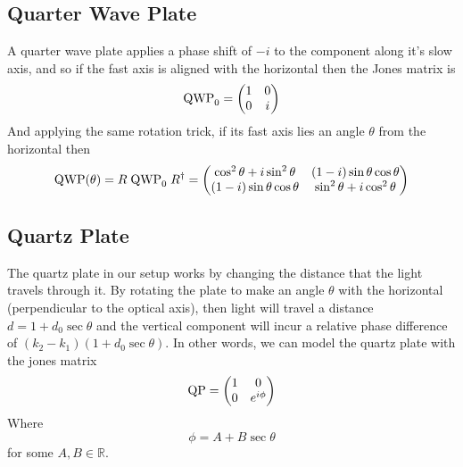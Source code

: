	\subsection{Quarter Wave Plate}
	A quarter wave plate applies a phase shift of $-i$ to the component along it's slow axis, and so if the fast axis is aligned with the horizontal then the Jones matrix is
	\begin{equation}
		\text{\rmfamily QWP\normalfont}_0 = \begin{pmatrix}
			1 & 0 \\ 0 & i
		\end{pmatrix}
	\end{equation}
	And applying the same rotation trick, if its fast axis lies an angle $\theta$ from the horizontal then
	\begin{equation}
		\text{\rmfamily QWP\normalfont}(\theta) = R\;\text{\rmfamily QWP\normalfont}_0\;R^\dagger = \begin{pmatrix}
			\cos^2\theta + i\sin^2\theta & (1-i)\sin\theta\cos\theta \\
			(1-i)\sin\theta\cos\theta & \sin^2\theta + i\cos^2\theta
		\end{pmatrix}
	\end{equation}
	
	\subsection{Quartz Plate}
	
	The quartz plate in our setup works by changing the distance that the light travels through it. By rotating the plate to make an angle $\theta$ with the horizontal (perpendicular to the optical axis), then light will travel a distance $d=1+d_0\sec\theta$ and the vertical component will incur a relative phase difference of $(k_2-k_1)(1+d_0\sec\theta)$. In other words, we can model the quartz plate with the jones matrix
	\begin{equation}
		\text{\rmfamily QP\normalfont} = \begin{pmatrix}
			1 & 0 \\ 0 & e^{i\phi}
		\end{pmatrix}
	\end{equation}
	Where
	\begin{equation}
		\phi = A + B\sec\theta
	\end{equation}
	for some $A,B\in\mathbb{R}$.